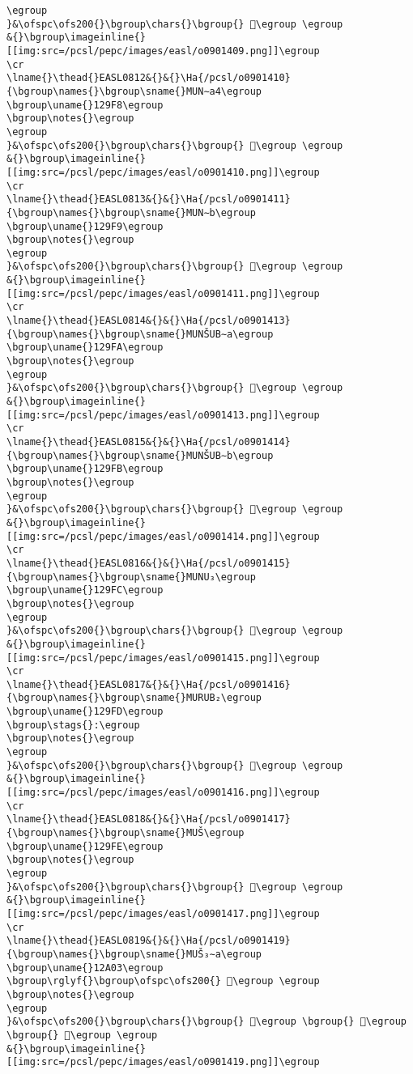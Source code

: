 \begin{verbatim}
\egroup
}&\ofspc\ofs200{}\bgroup\chars{}\bgroup{} 𒧷\egroup \egroup
&{}\bgroup\imageinline{}[[img:src=/pcsl/pepc/images/easl/o0901409.png]]\egroup
\cr
\lname{}\thead{}EASL0812&{}&{}\Ha{/pcsl/o0901410}{\bgroup\names{}\bgroup\sname{}MUN∼a4\egroup
\bgroup\uname{}129F8\egroup
\bgroup\notes{}\egroup
\egroup
}&\ofspc\ofs200{}\bgroup\chars{}\bgroup{} 𒧸\egroup \egroup
&{}\bgroup\imageinline{}[[img:src=/pcsl/pepc/images/easl/o0901410.png]]\egroup
\cr
\lname{}\thead{}EASL0813&{}&{}\Ha{/pcsl/o0901411}{\bgroup\names{}\bgroup\sname{}MUN∼b\egroup
\bgroup\uname{}129F9\egroup
\bgroup\notes{}\egroup
\egroup
}&\ofspc\ofs200{}\bgroup\chars{}\bgroup{} 𒧹\egroup \egroup
&{}\bgroup\imageinline{}[[img:src=/pcsl/pepc/images/easl/o0901411.png]]\egroup
\cr
\lname{}\thead{}EASL0814&{}&{}\Ha{/pcsl/o0901413}{\bgroup\names{}\bgroup\sname{}MUNŠUB∼a\egroup
\bgroup\uname{}129FA\egroup
\bgroup\notes{}\egroup
\egroup
}&\ofspc\ofs200{}\bgroup\chars{}\bgroup{} 𒧺\egroup \egroup
&{}\bgroup\imageinline{}[[img:src=/pcsl/pepc/images/easl/o0901413.png]]\egroup
\cr
\lname{}\thead{}EASL0815&{}&{}\Ha{/pcsl/o0901414}{\bgroup\names{}\bgroup\sname{}MUNŠUB∼b\egroup
\bgroup\uname{}129FB\egroup
\bgroup\notes{}\egroup
\egroup
}&\ofspc\ofs200{}\bgroup\chars{}\bgroup{} 𒧻\egroup \egroup
&{}\bgroup\imageinline{}[[img:src=/pcsl/pepc/images/easl/o0901414.png]]\egroup
\cr
\lname{}\thead{}EASL0816&{}&{}\Ha{/pcsl/o0901415}{\bgroup\names{}\bgroup\sname{}MUNU₃\egroup
\bgroup\uname{}129FC\egroup
\bgroup\notes{}\egroup
\egroup
}&\ofspc\ofs200{}\bgroup\chars{}\bgroup{} 𒧼\egroup \egroup
&{}\bgroup\imageinline{}[[img:src=/pcsl/pepc/images/easl/o0901415.png]]\egroup
\cr
\lname{}\thead{}EASL0817&{}&{}\Ha{/pcsl/o0901416}{\bgroup\names{}\bgroup\sname{}MURUB₂\egroup
\bgroup\uname{}129FD\egroup
\bgroup\stags{}:\egroup
\bgroup\notes{}\egroup
\egroup
}&\ofspc\ofs200{}\bgroup\chars{}\bgroup{} 𒧽\egroup \egroup
&{}\bgroup\imageinline{}[[img:src=/pcsl/pepc/images/easl/o0901416.png]]\egroup
\cr
\lname{}\thead{}EASL0818&{}&{}\Ha{/pcsl/o0901417}{\bgroup\names{}\bgroup\sname{}MUŠ\egroup
\bgroup\uname{}129FE\egroup
\bgroup\notes{}\egroup
\egroup
}&\ofspc\ofs200{}\bgroup\chars{}\bgroup{} 𒧾\egroup \egroup
&{}\bgroup\imageinline{}[[img:src=/pcsl/pepc/images/easl/o0901417.png]]\egroup
\cr
\lname{}\thead{}EASL0819&{}&{}\Ha{/pcsl/o0901419}{\bgroup\names{}\bgroup\sname{}MUŠ₃∼a\egroup
\bgroup\uname{}12A03\egroup
\bgroup\rglyf{}\bgroup\ofspc\ofs200{} 𒨃\egroup \egroup
\bgroup\notes{}\egroup
\egroup
}&\ofspc\ofs200{}\bgroup\chars{}\bgroup{} 𒧿\egroup \bgroup{} 𒨂\egroup \bgroup{} 𒨃\egroup \egroup
&{}\bgroup\imageinline{}[[img:src=/pcsl/pepc/images/easl/o0901419.png]]\egroup

\end{verbatim}
